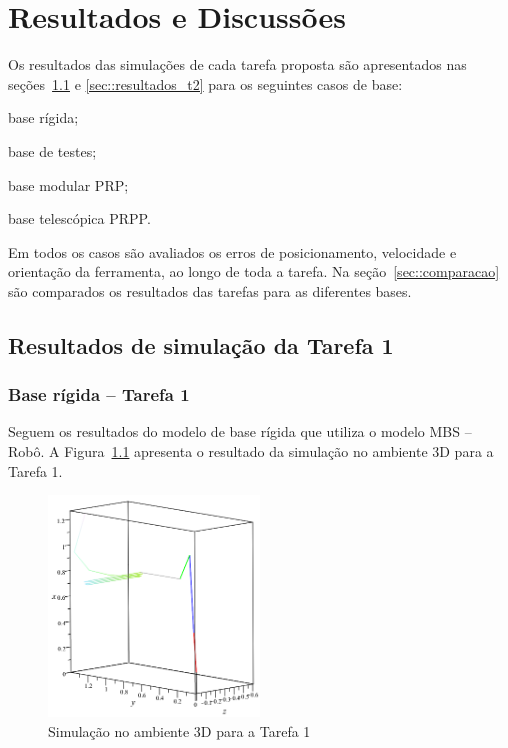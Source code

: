 \chapter{Resultados e Discussões} \label{cap::resultados}

Os resultados das simulações de cada tarefa proposta são apresentados nas
seções~\ref{sec::resultados_t1} e \ref{sec::resultados_t2} para os seguintes
casos de base:
%
\begin{enumerate*}[label=\emph{\roman*})]
	\item base rígida;
	\item base de testes;
	\item base modular PRP;
	\item base telescópica PRPP.
\end{enumerate*}
%

Em todos os casos são avaliados os erros de posicionamento, velocidade e
orientação da ferramenta, ao longo de toda a tarefa. Na
seção~\ref{sec::comparacao} são comparados os resultados das tarefas para as
diferentes bases.

\section{Resultados de simulação da Tarefa 1} \label{sec::resultados_t1}


\subsection{Base rígida -- Tarefa 1} \label{sec::res_rigida}

Seguem os resultados do modelo de base rígida que utiliza o modelo MBS --
Robô.
A Figura~\ref{fig::t1_anima3D_base_rig} apresenta o resultado da simulação no ambiente
3D para a Tarefa 1.

\begin{figure}[h!]
	\centering 
 	\includegraphics[width=0.50\textwidth]{figs/t1_anima3D_base_rig}
 	\caption{Simulação no ambiente 3D para a Tarefa 1}
 	\label{fig::t1_anima3D_base_rig}
\end{figure}

